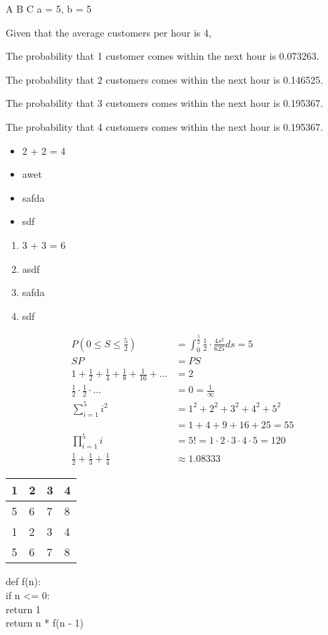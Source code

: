 \documentclass[11pt]{article}
\begin{document}
    
        A
        B
        C
a = 5, b = 5
    
    Given that the average customers per hour is 4,
    
    The probability that 1 customer comes within the next hour is 0.073263.
    
    The probability that 2 customers comes within the next hour is 0.146525.
    
    The probability that 3 customers comes within the next hour is 0.195367.
    
    The probability that 4 customers comes within the next hour is 0.195367.
    

    
    \begin{itemize}
        \item  2 + 2 = 4
        \item  awet
        \item  safda
        \item  sdf
    \end{itemize}
    
    \begin{enumerate}
        \item  3 + 3 = 6
        \item  asdf
        \item  safda
        \item  sdf
    \end{enumerate}
    
    \begin{align*}
        P(0 \leq S \leq \frac{5}{2}) &= \int_{0}^{\frac{5}{2}} \frac{1}{2} \cdot \frac{{4s^2}}{625} ds = 5 \\
        SP &= PS \\
        1 + \frac{1}{2}+\frac{1}{4}+\frac{1}{8}+\frac{1}{16} + \hdots &= 2 \\
        \frac{1}{2} \cdot \frac{1}{2} \cdot \hdots &= 0 = \frac{1}{\infty} \\
        \sum_{i = 1}^{5} i^2 &= 1^2+2^2+3^2+4^2+5^2 \\
        &= 1+4+9+16+25 = 55 \\
        \prod_{i = 1}^{5} i &= 5! = 1 \cdot 2 \cdot 3 \cdot 4 \cdot 5 = 120 \\
        \frac{1}{2} + \frac{1}{3} + \frac{1}{4} &\approx 1.08333
    \end{align*}
    
    \begin{center}\begin{tabular}{|c||l|l|l|}
        \hline 
        1 & 2 & 3 & 4 \\ \hline 
        5 & 6 & 7 & 8 \\ \hline 
        1 & 2 & 3 & 4 \\ \hline 
        5 & 6 & 7 & 8 \\ \hline 
    \end{tabular}
    \end{center}
    
    {\ttfamily 
        def f(n): \\
            if n <= 0: \\
                return 1 \\
            
            return n * f(n - 1)}
\end{document}
